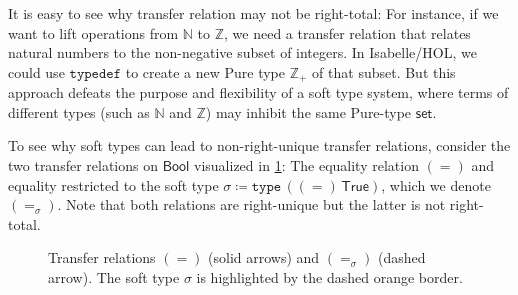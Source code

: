 \documentclass{article}
\theoremstyle{definition}
\newcommand{\bool}{\mathsf{Bool}}
\newcommand{\nat}{\mathbb{N}}
\newcommand{\inte}{\mathbb{Z}}
\newcommand{\true}{\mathsf{True}}
\newcommand{\false}{\mathsf{False}}
\begin{document}
It is easy to see why transfer relation may not be right-total:
For instance, if we want to lift operations from \(\nat\) to $\inte$,
we need a transfer relation that relates natural numbers to
the non-negative subset of integers.
In Isabelle/HOL, we could use $\mathtt{typedef}$ to create a new Pure
type $\inte_+$ of that subset.
But this approach defeats the purpose and flexibility of a soft type system,
where terms of different types (such as $\nat$ and $\inte$)
may inhibit the same Pure-type $\mathsf{set}$.

To see why soft types can lead to non-right-unique transfer relations,
consider the two transfer relations on $\bool$ visualized in \cref{fig:bool-rels}:
The equality relation \((=)\) and equality restricted to the soft type \(\sigma \coloneqq \mathtt{type}\, ((=)\,\true)\),
which we denote \((=_\sigma)\).
Note that both relations are right-unique but the latter is not right-total.

\begin{figure}[ht]
	\centering
	\caption{Transfer relations \((=)\) (solid arrows) and \((=_\sigma)\) (dashed arrow). The soft type \(\sigma\) is highlighted by the dashed orange border.}
	\label{fig:bool-rels}
\end{figure}
\end{document}
